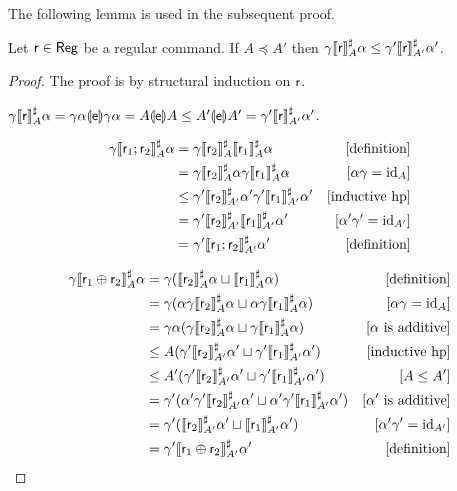 The following lemma is used in the subsequent proof.
\begin{lemma}\label{lmm:app:comp-abs-monotone-domain}
	Let $\mathsf{r} \in \mathsf{Reg}$ be a regular command. If $A \preceq A'$ then $\gamma \llbracket\mathsf{r}\rrbracket^{\sharp}_{A} \alpha \le \gamma' \llbracket\mathsf{r}\rrbracket^{\sharp}_{A'} \alpha'$.
\end{lemma}
\begin{proof}
	The proof is by structural induction on $\mathsf{r}$.
	
	\proofcase{($\regr = \expe$)}
	$\gamma \llbracket\mathsf{r}\rrbracket^{\sharp}_A \alpha = \gamma \alpha \llparenthesis\mathsf{e}\rrparenthesis \gamma \alpha = A \llparenthesis\mathsf{e}\rrparenthesis A \le A' \llparenthesis\mathsf{e}\rrparenthesis A' = \gamma' \llbracket\mathsf{r}\rrbracket^{\sharp}_{A'} \alpha'$.
	
	\begin{align*}
		\gamma \llbracket\mathsf{r}_1; \mathsf{r}_2\rrbracket^{\sharp}_A \alpha &= \gamma \llbracket\mathsf{r}_2\rrbracket^{\sharp}_A \llbracket\mathsf{r}_1\rrbracket^{\sharp}_A \alpha &[\text{definition}]\\
		&= \gamma \llbracket\mathsf{r}_2\rrbracket^{\sharp}_A \alpha \gamma \llbracket\mathsf{r}_1\rrbracket^{\sharp}_A \alpha &[\alpha \gamma = \text{id}_A] \\
		&\le \gamma' \llbracket\mathsf{r}_2\rrbracket^{\sharp}_{A'} \alpha' \gamma' \llbracket\mathsf{r}_1\rrbracket^{\sharp}_{A'} \alpha' &[\text{inductive hp}] \\
		&= \gamma' \llbracket\mathsf{r}_2\rrbracket^{\sharp}_{A'} \llbracket\mathsf{r}_1\rrbracket^{\sharp}_{A'} \alpha' &[\alpha' \gamma' = \text{id}_{A'}] \\
		&= \gamma' \llbracket\mathsf{r}_1; \mathsf{r}_2\rrbracket^{\sharp}_{A'} \alpha' &[\text{definition}]
	\end{align*}
	
	\begin{align*}
		\gamma \llbracket\mathsf{r}_1 \oplus \mathsf{r}_2\rrbracket^{\sharp}_A \alpha &= \gamma (\llbracket\mathsf{r}_2\rrbracket^{\sharp}_A \alpha \sqcup \llbracket\mathsf{r}_1\rrbracket^{\sharp}_A \alpha) &[\text{definition}]\\
		&= \gamma (\alpha \gamma \llbracket\mathsf{r}_2\rrbracket^{\sharp}_A \alpha \sqcup \alpha \gamma \llbracket\mathsf{r}_1\rrbracket^{\sharp}_A \alpha) &[\alpha \gamma = \text{id}_A] \\
		&= \gamma \alpha (\gamma \llbracket\mathsf{r}_2\rrbracket^{\sharp}_A \alpha \sqcup \gamma \llbracket\mathsf{r}_1\rrbracket^{\sharp}_A \alpha) &[\alpha \text{ is additive}] \\
		&\le A (\gamma' \llbracket\mathsf{r}_2\rrbracket^{\sharp}_{A'} \alpha' \sqcup \gamma' \llbracket\mathsf{r}_1\rrbracket^{\sharp}_{A'} \alpha') &[\text{inductive hp}] \\
		&\le A' (\gamma' \llbracket\mathsf{r}_2\rrbracket^{\sharp}_{A'} \alpha' \sqcup \gamma' \llbracket\mathsf{r}_1\rrbracket^{\sharp}_{A'} \alpha') &[A \le A'] \\
		&= \gamma' (\alpha' \gamma' \llbracket\mathsf{r}_2\rrbracket^{\sharp}_{A'} \alpha' \sqcup \alpha' \gamma' \llbracket\mathsf{r}_1\rrbracket^{\sharp}_{A'} \alpha') &[\alpha' \text{ is additive}] \\
		&= \gamma' (\llbracket\mathsf{r}_2\rrbracket^{\sharp}_{A'} \alpha' \sqcup \llbracket\mathsf{r}_1\rrbracket^{\sharp}_{A'} \alpha') &[\alpha' \gamma' = \text{id}_{A'}] \\
		&= \gamma' \llbracket\mathsf{r}_1 \oplus \mathsf{r}_2\rrbracket^{\sharp}_{A'} \alpha' &[\text{definition}]
	\end{align*}
	

\end{proof}
